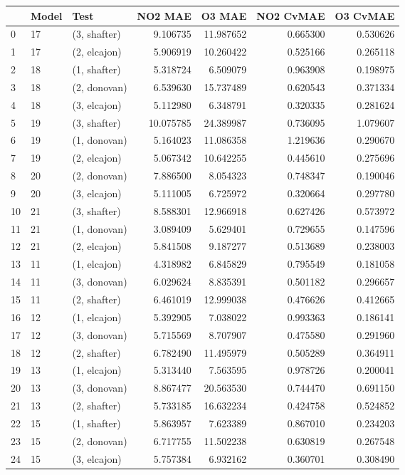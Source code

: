 \begin{tabular}{lllrrrr}
\toprule
{} & Model &          Test &    NO2 MAE &     O3 MAE &  NO2 CvMAE &  O3 CvMAE \\
\midrule
0  &    17 &  (3, shafter) &   9.106735 &  11.987652 &   0.665300 &  0.530626 \\
1  &    17 &  (2, elcajon) &   5.906919 &  10.260422 &   0.525166 &  0.265118 \\
2  &    18 &  (1, shafter) &   5.318724 &   6.509079 &   0.963908 &  0.198975 \\
3  &    18 &  (2, donovan) &   6.539630 &  15.737489 &   0.620543 &  0.371334 \\
4  &    18 &  (3, elcajon) &   5.112980 &   6.348791 &   0.320335 &  0.281624 \\
5  &    19 &  (3, shafter) &  10.075785 &  24.389987 &   0.736095 &  1.079607 \\
6  &    19 &  (1, donovan) &   5.164023 &  11.086358 &   1.219636 &  0.290670 \\
7  &    19 &  (2, elcajon) &   5.067342 &  10.642255 &   0.445610 &  0.275696 \\
8  &    20 &  (2, donovan) &   7.886500 &   8.054323 &   0.748347 &  0.190046 \\
9  &    20 &  (3, elcajon) &   5.111005 &   6.725972 &   0.320664 &  0.297780 \\
10 &    21 &  (3, shafter) &   8.588301 &  12.966918 &   0.627426 &  0.573972 \\
11 &    21 &  (1, donovan) &   3.089409 &   5.629401 &   0.729655 &  0.147596 \\
12 &    21 &  (2, elcajon) &   5.841508 &   9.187277 &   0.513689 &  0.238003 \\
13 &    11 &  (1, elcajon) &   4.318982 &   6.845829 &   0.795549 &  0.181058 \\
14 &    11 &  (3, donovan) &   6.029624 &   8.835391 &   0.501182 &  0.296657 \\
15 &    11 &  (2, shafter) &   6.461019 &  12.999038 &   0.476626 &  0.412665 \\
16 &    12 &  (1, elcajon) &   5.392905 &   7.038022 &   0.993363 &  0.186141 \\
17 &    12 &  (3, donovan) &   5.715569 &   8.707907 &   0.475580 &  0.291960 \\
18 &    12 &  (2, shafter) &   6.782490 &  11.495979 &   0.505289 &  0.364911 \\
19 &    13 &  (1, elcajon) &   5.313440 &   7.563595 &   0.978726 &  0.200041 \\
20 &    13 &  (3, donovan) &   8.867477 &  20.563530 &   0.744470 &  0.691150 \\
21 &    13 &  (2, shafter) &   5.733185 &  16.632234 &   0.424758 &  0.524852 \\
22 &    15 &  (1, shafter) &   5.863957 &   7.623389 &   0.867010 &  0.234203 \\
23 &    15 &  (2, donovan) &   6.717755 &  11.502238 &   0.630819 &  0.267548 \\
24 &    15 &  (3, elcajon) &   5.757384 &   6.932162 &   0.360701 &  0.308490 \\
\bottomrule
\end{tabular}
